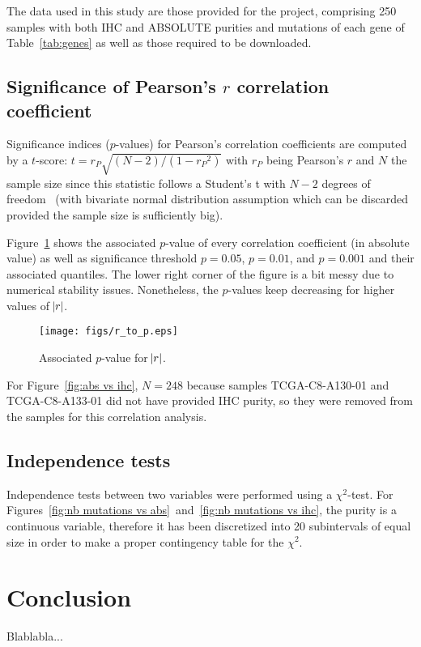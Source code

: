 \documentclass[letterpaper]{article}
\begin{document}
The data used in this study are those provided for the project, comprising 250 samples with both IHC and ABSOLUTE purities and mutations of each gene of Table~\ref{tab:genes}
as well as those required to be downloaded.

\subsection{Significance of Pearson's $r$ correlation coefficient}
Significance indices ($p$-values) for Pearson's correlation coefficients are computed by a $t$-score: $t = r_P\sqrt{(N-2)/(1-{r_P}^2)}$ with $r_P$ being Pearson's $r$ and $N$
the sample size since this statistic follows a Student's t with $N-2$ degrees of freedom~\citep{lee1988thirteen} (with bivariate normal distribution assumption which
can be discarded provided the sample size is sufficiently big).

Figure~\ref{fig:r to p} shows the associated $p$-value of every correlation coefficient (in absolute value) as well as significance threshold $p = 0.05$, $p = 0.01$, and $p = 0.001$
and their associated quantiles. The lower right corner of the figure is a bit messy due to numerical stability issues. Nonetheless, the $p$-values keep decreasing for higher
values of $\abs r$.

\begin{figure}[!h]
\texttt{[image: figs/r\_to\_p.eps]}
\caption{Associated $p$-value for $\abs r$.\label{fig:r to p}}
\end{figure}

For Figure~\ref{fig:abs vs ihc}, $N=248$ because samples TCGA-C8-A130-01 and TCGA-C8-A133-01 did not have provided IHC purity, so they were removed from the samples
for this correlation analysis.

\subsection{Independence tests}
Independence tests between two variables were performed using a $\chi^2$-test. For Figures~\ref{fig:nb mutations vs abs}~and~\ref{fig:nb mutations vs ihc}, the purity is a
continuous variable, therefore it has been discretized into 20 subintervals of equal size in order to make a proper contingency table for the $\chi^2$.

\section{Conclusion}
Blablabla...

\newpage
\footnotesize

{}
\end{document}
